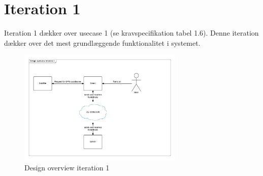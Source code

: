 \section{Iteration 1}

Iteration 1 dækker over usecase 1 (se kravspecifikation tabel 1.6). Denne iteration dækker over det mest grundlæggende funktionalitet i systemet. 

\vspace{-5pt}
\begin{figure}[H]
	\centering
	\includegraphics[width=0.7\textwidth]{kapitler/software/iterationer/iteration_1/billeder/design_overview_iteration1.png}
	\vspace{-5pt}
	\caption{Design overview iteration 1}
	\label{fig:design_overview_it1}
\end{figure}

